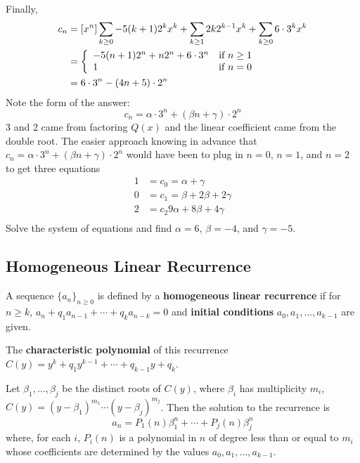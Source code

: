 \documentclass[english, 11pt]{article}
\begin{document}
\begin{exmp}
\begin{align*}
         \end{align*}
         Finally,
         \begin{align*}
           c_n & = [x^n]\sum_{k \geq 0} -5(k+1)2^kx^k + \sum_{k \geq 1}2k2^{k-1}x^{k} + \sum_{k \geq 0} 6 \cdot 3^k x^k \\
           & = \left\{ \begin{array}{lr} -5(n+1)2^n + n2^n + 6 \cdot 3^n & \mbox{if $n \geq 1$} \\ 1 & \mbox{if $n = 0$} \end{array} \right. \\
           & = 6\cdot 3^n - (4n + 5) \cdot 2^n
         \end{align*}
         Note the form of the answer:
         \[ c_n = \alpha \cdot 3^n + (\beta n + \gamma) \cdot 2^n \]
         3 and 2 came from factoring $Q(x)$ and the linear coefficient came from the double root. The easier approach knowing in advance that $c_n = \alpha \cdot 3^n + (\beta n + \gamma) \cdot 2^n$ would have been to plug in $n = 0$, $n = 1$, and $n = 2$ to get three equations
         \begin{align*}
           1 & = c_0 = \alpha + \gamma \\
           0 & = c_1  = \beta + 2\beta + 2\gamma\\
           2 & = c_2  9 \alpha + 8 \beta + 4\gamma \\
         \end{align*}
         Solve the system of equations and find $\alpha = 6$, $\beta = -4$, and $\gamma = -5$.
       \end{exmp}

     \subsection{Homogeneous Linear Recurrence}
       A sequence $\{a_n\}_{n \geq 0}$ is defined by a \textbf{homogeneous linear recurrence} if for $n \geq k$, $a_n + q_1a_{n-1}+\cdots+q_ka_{n-k} = 0$ and \textbf{initial conditions} $a_0, a_1, \ldots, a_{k-1}$ are given. \\

       \begin{defn}\label{characteristic polynomial}
       The \textbf{characteristic polynomial} of this recurrence $C(y) = y^k + q_1y^{k-1} + \cdots + q_{k-1}y + q_k$.
       \end{defn}

       \begin{thrm}\label{whateva}
Let $\beta_1, \ldots, \beta_j$ be the distinct roots of $C(y)$, where $\beta_i$ has multiplicity $m_i$, $C(y) = (y-\beta_1)^{m_1} \cdots (y-\beta_j)^{m_j}$. Then the solution to the recurrence is
\[ a_n = P_1(n)\beta_1^n + \cdots + P_j(n)\beta_j^n \]
where, for each $i$, $P_i(n)$ is a polynomial in $n$ of degree less than or equal to $m_i$ whose coefficients are determined by the values $a_0, a_1, \ldots, a_{k-1}$.
       \end{thrm}
\end{document}

